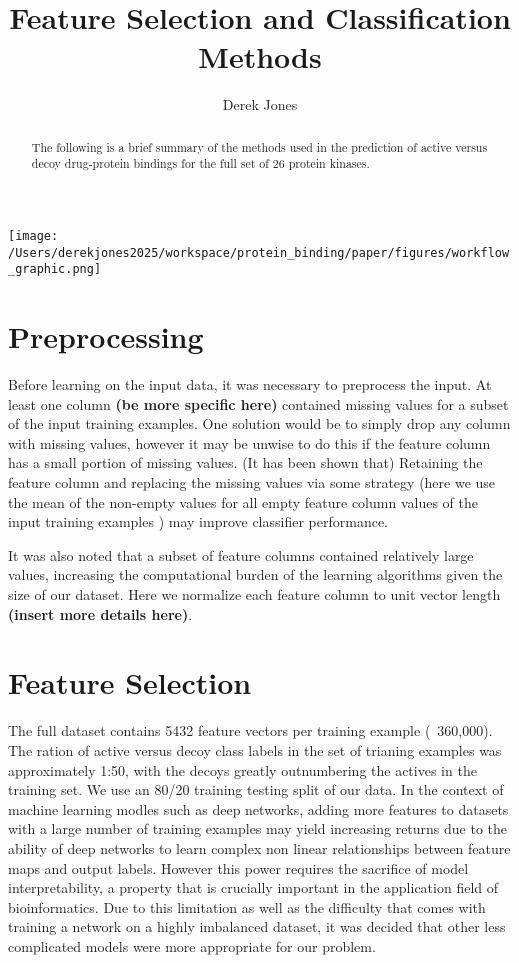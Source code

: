 \documentclass{article}
\title{Feature Selection and Classification Methods}
\author{Derek Jones}
\begin{document}
\maketitle

\begin{center}
\texttt{[image: /Users/derekjones2025/workspace/protein\_binding/paper/figures/workflow\_graphic.png]}
\end{center}

\begin{abstract}
The following is a brief summary of the methods used in the prediction of active versus decoy drug-protein bindings for the full set of 26 protein kinases. 
\end{abstract}

\section{Preprocessing}
Before learning on the input data, it was necessary to preprocess the input. At least one column \textbf{(be more specific here)} contained missing values for a subset of the input training examples. One solution would be to simply drop any column with missing values, however it may be unwise to do this if the feature column has a small portion of missing values. (It has been shown that) Retaining the feature column and replacing the missing values via some strategy (here we use the mean of the non-empty values for all empty feature column values of the input training examples ) may improve classifier performance. 

It was also noted that a subset of feature columns contained relatively large values, increasing the computational burden of the learning algorithms given the size of our dataset. Here we normalize each feature column to unit vector length \textbf{(insert more details here)}.   

\section{Feature Selection}
The full dataset contains 5432 feature vectors per training example (~360,000). The ration of active versus decoy class labels in the set of trianing examples was approximately 1:50, with the decoys greatly outnumbering the actives in the training set. We use an 80/20 training testing split of our data. In the context of machine learning modles such as deep networks, adding more features to datasets with a large number of training examples may yield increasing returns due to the ability of deep networks to learn complex non linear relationships between feature maps and output labels. However this power requires the sacrifice of model interpretability, a property that is crucially important in the application field of bioinformatics. Due to this limitation as well as the difficulty that comes with training a network on a highly imbalanced dataset, it was decided that other less complicated models were more appropriate for our problem. 
\end{document}
